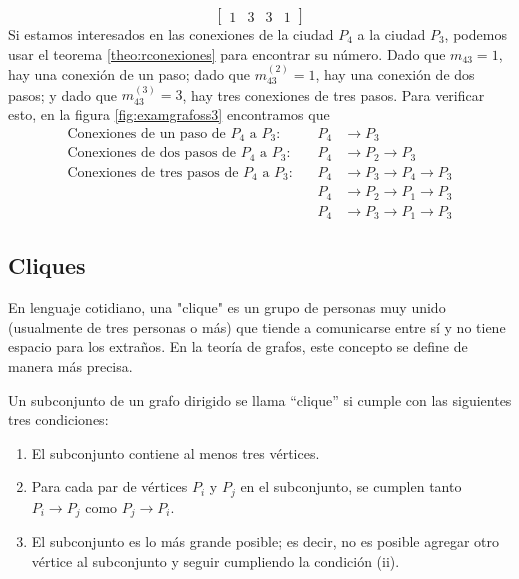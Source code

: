 \begin{example}
$$\begin{bmatrix}
        1 & 3 & 3 & 1
    \end{bmatrix}$$
    Si estamos interesados en las conexiones de la ciudad $P_4$ a la ciudad $P_3$, podemos usar el teorema \ref{theo:rconexiones} para encontrar su número. Dado que $m_{43} = 1$, hay una conexión de un paso; dado que $m_{43}^{(2)} = 1$, hay una conexión de dos pasos; y dado que $m_{43}^{(3)} = 3$, hay tres conexiones de tres pasos. Para verificar esto, en la figura \ref{fig:examgrafoss3} encontramos que
    \begin{align*}
        \text{Conexiones de un paso de } P_4 \text{ a } P_3:& & P_4 &\to P_3 \\
        \text{Conexiones de dos pasos de } P_4 \text{ a } P_3:& & P_4 &\to P_2 \to P_3 \\
        \text{Conexiones de tres pasos de } P_4 \text{ a } P_3:& & P_4 &\to P_3 \to P_4 \to P_3 \\
        & & P_4 &\to P_2 \to P_1 \to P_3 \\
        & & P_4 &\to P_3 \to P_1 \to P_3
    \end{align*}
\end{example}

\subsection*{Cliques}

En lenguaje cotidiano, una "clique" es un grupo de personas muy unido (usualmente de tres personas o más) que tiende a comunicarse entre sí y no tiene espacio para los extraños. En la teoría de grafos, este concepto se define de manera más precisa.

\begin{definition}
    Un subconjunto de un grafo dirigido se llama “clique” si cumple con las siguientes tres condiciones:
    \begin{enumerate}[label=\roman*)]
        \item El subconjunto contiene al menos tres vértices.
        \item Para cada par de vértices $P_i$ y $P_j$ en el subconjunto, se cumplen tanto $P_i \rightarrow P_j$ como $P_j \rightarrow P_i$.
        \item El subconjunto es lo más grande posible; es decir, no es posible agregar otro vértice al subconjunto y seguir cumpliendo la condición (ii).
    \end{enumerate}
\end{definition}

